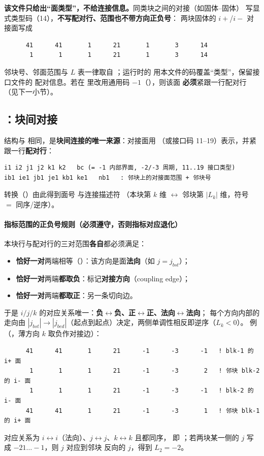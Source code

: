 \textbf{该文件只给出“面类型”，不给连接信息。}同类块之间的对接（如固体--固体）
写显式类型码（14），\textbf{不写配对行、范围也不带方向正负号}：
 两块固体的 $i+$/$i-$ 对接面写成
\begin{lstlisting}
      41      41       1      21       1       3      14
       1       1       1      21       1       3      14
\end{lstlisting}
邻块号、邻面范围与 $L$ 表一律取自 ；运行时的
 用本文件的码覆盖“类型”，保留接口文件的
配对信息。若在  里改用通用码 $-1$（），则该面
\textbf{必须}紧跟一行配对行（见下一小节）。

\subsection{：块间对接}
结构与  相同，是\textbf{块间连接的唯一来源}：对接面用 
（或接口码 11--19）表示，并紧跟一行\textbf{配对行}：
\begin{lstlisting}
i1 i2 j1 j2 k1 k2   bc (= -1 内部界面, -2/-3 周期, 11..19 接口类型)
ib1 ie1 jb1 je1 kb1 ke1   nb1   : 邻块上的对接面范围 + 邻块号
\end{lstlisting}
转换（）由此得到面号  与连接描述符
（本块第 $k$ 维 $\leftrightarrow$ 邻块第 $|L_k|$ 维，符号 $=$ 同序/逆序）。

\paragraph{指标范围的正负号规则（必须遵守，否则指标对应退化）}
本块行与配对行的三对范围\textbf{各自}都必须满足：
\begin{itemize}
  \item \textbf{恰好一对}两端相等（）：该方向是面\textbf{法向}（如 $j=j_{bst}$）；
  \item \textbf{恰好一对}两端\textbf{都取负}：标记\textbf{对接方向}（coupling edge）；
  \item \textbf{恰好一对}两端\textbf{都取正}：另一条切向边。
\end{itemize}
于是 $i/j/k$ 的对应关系唯一：\textbf{负$\leftrightarrow$负、正$\leftrightarrow$正、法向$\leftrightarrow$法向}；
每个方向内部的走向由 $|j_{bst}|\to|j_{bed}|$（起点到起点）决定，两侧单调性相反即逆序（$L_k<0$）。
例（，薄方向 $k$ 取负作对接边）：
\begin{lstlisting}
      41      41       1      21      -1      -3      -1   ! blk-1 的 i+ 面
       1       1       1      21      -1      -3       2   ! 邻块 blk-2 的 i- 面
       1       1       1      21      -1      -3      -1   ! blk-2 的 i- 面
      41      41       1      21      -1      -3       1   ! 邻块 blk-1 的 i+ 面
\end{lstlisting}
对应关系为 $i\leftrightarrow i$（法向）、$j\leftrightarrow j$、$k\leftrightarrow k$ 且都同序，
即 ；若两块某一侧的 $j$ 写成 $-21\ldots-1$，则 $j$ 对应到邻块
反向的 $j$，得到 $L_2=-2$。

